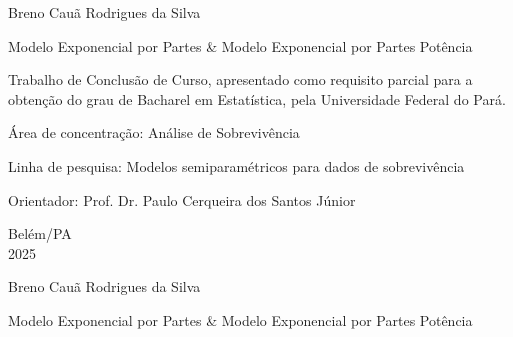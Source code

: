 \thispagestyle{empty}

\begin{center}

{\Large Breno Cauã Rodrigues da Silva}

\vspace{4.0 cm}

{\Huge Modelo Exponencial por Partes \& Modelo Exponencial por Partes Potência}

\end{center}

\vspace{4.0 cm}

{\normalsize
\hfill \parbox{9.0 cm}{Trabalho de Conclusão de Curso, apresentado como
requisito parcial para a obtenção do grau de Bacharel em Estatística, pela Universidade Federal do Pará. \\ \vspace{0.25 cm}

\noindent Área de concentração: Análise de Sobrevivência \\ \vspace{0.25 cm}

\noindent Linha de pesquisa: Modelos semiparamétricos para dados de sobrevivência \\ \vspace{0.25 cm}

\noindent Orientador: Prof. Dr. Paulo Cerqueira dos Santos Júnior}
}

\vspace{6.0 cm}

\begin{center}

{\large
Belém/PA \\ 2025
}

\vfill

\end{center}

\newpage

\thispagestyle{empty}

\begin{center}

{\Large Breno Cauã Rodrigues da Silva}

\vspace{2.0 cm}

{\Huge Modelo Exponencial por Partes \& Modelo Exponencial por Partes Potência}

\end{center}

